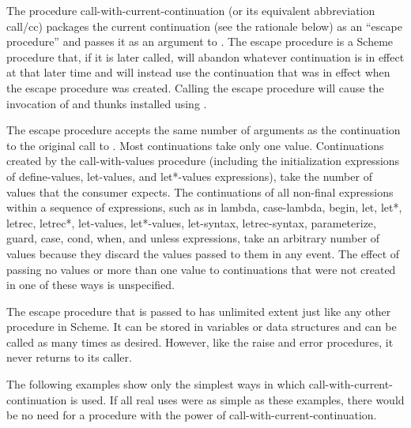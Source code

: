 \begin{entry}{
}

\label{continuations} 
The procedure {\cf call-with-current-continuation} (or its
equivalent abbreviation {\cf call/cc}) packages
the current continuation (see the rationale below) as an ``escape
procedure'' and passes it as an argument to
.
The escape procedure is a Scheme procedure that, if it is
later called, will abandon whatever continuation is in effect at that later
time and will instead use the continuation that was in effect
when the escape procedure was created.  Calling the escape procedure
will cause the invocation of  and  thunks installed using
.

The escape procedure accepts the same number of arguments as the continuation to
the original call to \callcc.
Most continuations take only one value.
Continuations created by the {\cf call-with-values}
procedure (including the initialization expressions of
{\cf define-values}, {\cf let-values}, and {\cf let*-values} expressions),
take the number of values that the consumer expects.
The continuations of all non-final expressions within a sequence
of expressions, such as in {\cf lambda}, {\cf case-lambda}, {\cf begin},
{\cf let}, {\cf let*}, {\cf letrec}, {\cf letrec*}, {\cf let-values},
{\cf let*-values}, {\cf let-syntax}, {\cf letrec-syntax}, {\cf parameterize},
{\cf guard}, {\cf case}, {\cf cond}, {\cf when}, and {\cf unless} expressions,
take an arbitrary number of values because they discard the values passed
to them in any event.
The effect of passing no values or more than one value to continuations
that were not created in one of these ways is unspecified.


\vest The escape procedure that is passed to  has
unlimited extent just like any other procedure in Scheme.  It can be stored
in variables or data structures and can be called as many times as desired.
However, like the {\cf raise} and {\cf error} procedures, it never
returns to its caller.

\vest The following examples show only the simplest ways in which
{\cf call-with-current-continuation} is used.  If all real uses were as
simple as these examples, there would be no need for a procedure with
the power of {\cf call-with-current-continuation}.


\end{entry}
